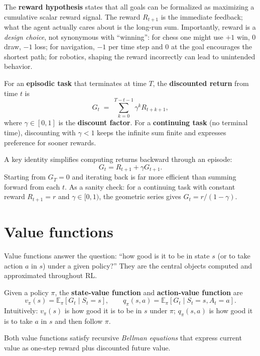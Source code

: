 \documentclass[11pt, oneside]{book}
\newcommand{\E}{\mathbb{E}}
\newcommand{\vpi}{v_{\pi}}              %
\newcommand{\qpi}{q_{\pi}}             %
\begin{document}
The \textbf{reward hypothesis} states that all goals can be formalized as
maximizing a cumulative scalar reward signal. The reward $R_{t+1}$ is the
immediate feedback; what the agent actually cares about is the long-run sum.
Importantly, reward is a \emph{design choice}, not synonymous with
``winning'': for chess one might use $+1$ win, $0$ draw, $-1$ loss; for
navigation, $-1$ per time step and $0$ at the goal encourages the shortest
path; for robotics, shaping the reward incorrectly can lead to unintended
behavior.

\begin{defbox}[title={Return and Discount Factor}]
For an \textbf{episodic task} that terminates at time $T$, the
\textbf{discounted return} from time $t$ is
\[
  G_t \;=\; \sum_{k=0}^{T-t-1} \gamma^k R_{t+k+1},
\]
where $\gamma \in [0,1]$ is the \textbf{discount factor}.
For a \textbf{continuing task} (no terminal time), discounting with
$\gamma < 1$ keeps the infinite sum finite and expresses preference for
sooner rewards.
\end{defbox}

A key identity simplifies computing returns backward through an episode:
\[
  G_t = R_{t+1} + \gamma G_{t+1}.
\]
Starting from $G_T = 0$ and iterating back is far more efficient than summing
forward from each $t$. As a sanity check: for a continuing task with constant
reward $R_{t+1} = r$ and $\gamma \in [0,1)$, the geometric series gives
$G_t = r/(1-\gamma)$.

\section{Value functions}

Value functions answer the question: ``how good is it to be in state $s$ (or
to take action $a$ in $s$) under a given policy?'' They are the central
objects computed and approximated throughout RL.

\begin{defbox}[title={State-Value and Action-Value Functions}]
Given a policy $\pi$, the \textbf{state-value function} and
\textbf{action-value function} are
\[
  \vpi(s) = \E_{\pi}[G_t \mid S_t=s],
  \qquad
  \qpi(s,a) = \E_{\pi}[G_t \mid S_t=s, A_t=a].
\]
Intuitively: $\vpi(s)$ is how good it is to be in $s$ under $\pi$;
$\qpi(s,a)$ is how good it is to take $a$ in $s$ and then follow $\pi$.
\end{defbox}

Both value functions satisfy recursive \emph{Bellman equations} that express
current value as one-step reward plus discounted future value.
\end{document}
